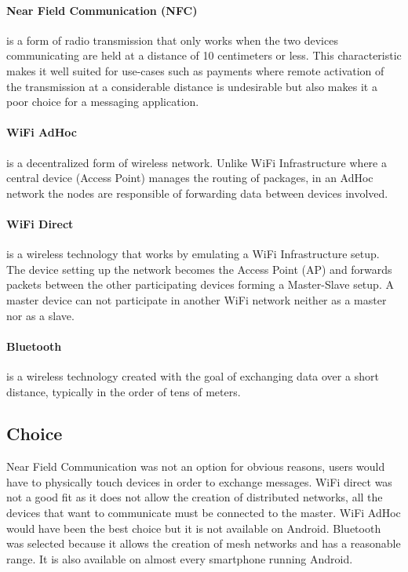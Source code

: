\paragraph{Near Field Communication (NFC)}
is a form of radio transmission that only works when the two devices communicating are held at a distance of 10 centimeters or less. 
This characteristic makes it well suited for use-cases such as payments where remote activation of the transmission at a considerable distance is undesirable but also makes it a poor choice for a messaging application.

\paragraph{WiFi AdHoc} 
is a decentralized form of wireless network. Unlike WiFi Infrastructure where a central device (Access Point) manages the routing of packages, in an AdHoc network the nodes are responsible of forwarding data between devices involved.

\paragraph{WiFi Direct}
is a wireless technology that works by emulating a WiFi Infrastructure setup. The device setting up the network becomes the Access Point (AP) and forwards packets between the other participating devices forming a Master-Slave setup.
A master device can not participate in another WiFi network neither as a master nor as a slave.

\paragraph{Bluetooth}
is a wireless technology created with the goal of exchanging data over a short distance, typically in the order of tens of meters.

\subsection{Choice}
Near Field Communication was not an option for obvious reasons, users would have to physically touch devices in order to exchange messages.
WiFi direct was not a good fit as it does not allow the creation of distributed networks, all the devices that want to communicate must be connected to the master.
WiFi AdHoc would have been the best choice but it is not available on Android.
Bluetooth was selected because it allows the creation of mesh networks and has a reasonable range. It is also available on almost every smartphone running Android.